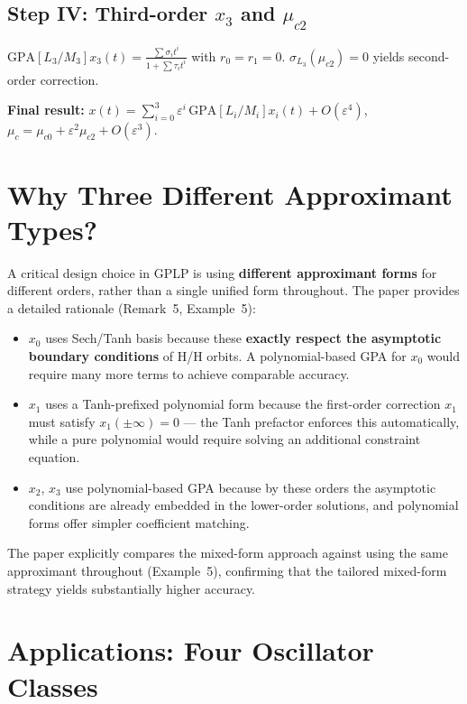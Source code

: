 \documentclass[11pt,a4paper]{article}
\begin{document}
\subsection{Step IV: Third-order $x_3$ and $\mu_{c2}$}

$\text{GPA}[L_3/M_3]x_3(t)=\frac{\sum\sigma_i t^i}{1+\sum\tau_i t^i}$ with $r_0=r_1=0$. $\sigma_{L_3}(\mu_{c2})=0$ yields second-order correction.

\noindent\textbf{Final result:} $x(t)=\sum_{i=0}^{3}\varepsilon^i\,\text{GPA}[L_i/M_i]x_i(t)+O(\varepsilon^4)$, \quad $\mu_c=\mu_{c0}+\varepsilon^2\mu_{c2}+O(\varepsilon^3)$.

\section{Why Three Different Approximant Types?}

A critical design choice in GPLP is using \textbf{different approximant forms} for different orders, rather than a single unified form throughout. The paper provides a detailed rationale (Remark~5, Example~5):

\begin{itemize}[leftmargin=2em]
\item $x_0$ uses Sech/Tanh basis because these \textbf{exactly respect the asymptotic boundary conditions} of H/H orbits. A polynomial-based GPA for $x_0$ would require many more terms to achieve comparable accuracy.
\item $x_1$ uses a Tanh-prefixed polynomial form because the first-order correction $x_1$ must satisfy $x_1(\pm\infty)=0$ --- the Tanh prefactor enforces this automatically, while a pure polynomial would require solving an additional constraint equation.
\item $x_2$, $x_3$ use polynomial-based GPA because by these orders the asymptotic conditions are already embedded in the lower-order solutions, and polynomial forms offer simpler coefficient matching.
\end{itemize}

The paper explicitly compares the mixed-form approach against using the same approximant throughout (Example~5), confirming that the tailored mixed-form strategy yields substantially higher accuracy.

\section{Applications: Four Oscillator Classes}
\end{document}

